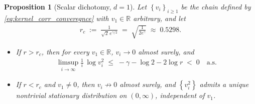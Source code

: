 \documentclass[10pt,a4paper]{amsart}
\newtheorem{proposition}{Proposition}
\newcommand{\RR}{\mathbb{R}}
\newcommand{\Set}[1]{\left\{ #1 \right\}}
\begin{document}
\begin{proposition}[Scalar dichotomy, $d = 1$]
  \label{prop:sync_v_convergence}
  Let $\Set{v_i}_{i \ge 1}$ be the chain defined by \eqref{eq:kernel_corr_converegnce} with $v_1 \in \RR$ arbitrary, and let
  \begin{eqnarray*}
    r_c \;:=\; \frac{1}{\sqrt{2}\, e^{\gamma/2}} \;=\; \sqrt{\frac{1}{2 e^\gamma}} \;\approx\; 0.5298.
  \end{eqnarray*}
  \begin{itemize}
    \item[(i)] If $r > r_c$, then for every $v_1 \in \RR$, $v_i \to 0$ almost surely, and
      \begin{eqnarray*}
        \limsup_{i \to \infty} \frac{1}{i}\, \log v_i^2 \;\le\; -\gamma - \log 2 - 2\log r \;<\; 0 \quad \text{a.s.}
      \end{eqnarray*}
    \item[(ii)] If $r < r_c$ and $v_1 \ne 0$, then $v_i \not\to 0$ almost surely, and $\Set{v_i^2}$ admits a unique nontrivial stationary distribution on $(0, \infty)$, independent of $v_1$.
  \end{itemize}
\end{proposition}
\end{document}

